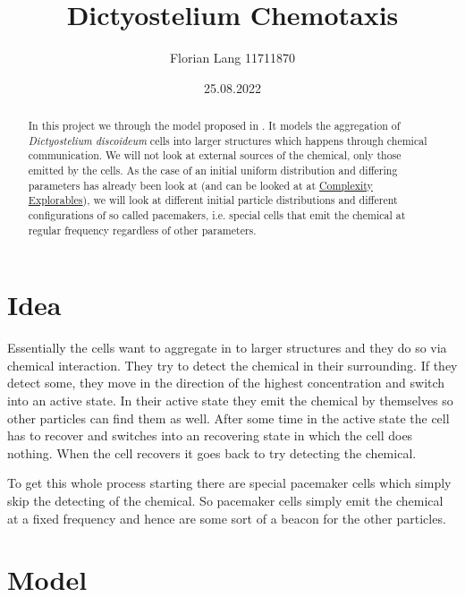 \documentclass{class}
\title{Dictyostelium Chemotaxis}
\author{Florian Lang 11711870}
\date{25.08.2022}
\begin{document}
\maketitle

\begin{abstract}
In this project we through the model proposed in \cite{paper}.
It models the aggregation of \emph{Dictyostelium discoideum} cells into larger structures which happens through chemical communication.
We will not look at external sources of the chemical, only those emitted by the cells.
As the case of an initial uniform distribution and differing parameters has already been look at (and can be looked at at \href{https://www.complexity-explorables.org/explorables/come-together/}{Complexity Explorables}), we will look at different initial particle distributions and different configurations of so called pacemakers, i.e. special cells that emit the chemical at regular frequency regardless of other parameters.
\end{abstract}

\section{Idea}

Essentially the cells want to aggregate in to larger structures and they do so via chemical interaction.
They try to detect the chemical in their surrounding.
If they detect some, they move in the direction of the highest concentration and switch into an active state.
In their active state they emit the chemical by themselves so other particles can find them as well.
After some time in the active state the cell has to recover and switches into an recovering state in which the cell does nothing.
When the cell recovers it goes back to try detecting the chemical.

To get this whole process starting there are special pacemaker cells which simply skip the detecting of the chemical.
So pacemaker cells simply emit the chemical at a fixed frequency and hence are some sort of a beacon for the other particles.

\section{Model}
\end{document}
